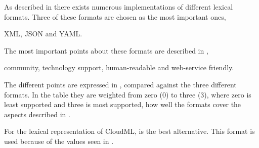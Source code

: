 As described in  there exists numerous implementations of different lexical formats.
Three of these formats are chosen as the most important ones,
\begin{ii}
  \iitem XML,
  \iitem JSON and
  \iitem YAML.
\end{ii}
The most important points about these formats are described in ,
\ie
\begin{ii}
  \iitem community,
  \iitem technology support,
  \iitem human-readable and
  \iitem web-service friendly.
\end{ii}
The different points are expressed in , 
compared against the three different formats.
In the table they are weighted from zero ($0$) to three ($3$),
where zero is least supported and three is most supported,
\ie how well the formats cover the aspects described in .

For the lexical representation of CloudML,  is the best alternative.
This format is used because of the values seen in .

